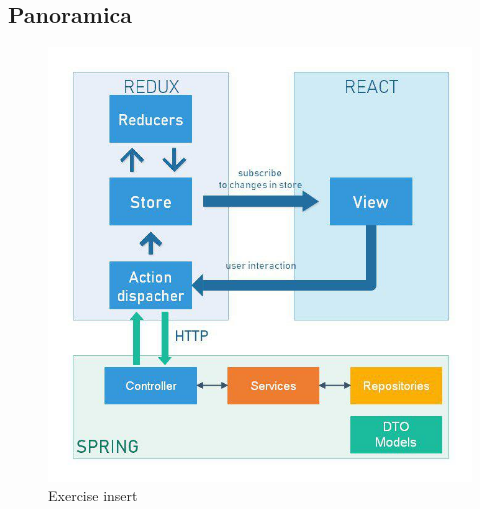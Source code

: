\subsection{Panoramica}
\begin{figure}[H]
\centering
\includegraphics[width=17cm, keepaspectratio]{img/photo_2019-04-08_19-26-02.jpg} 
\caption{Exercise insert}
\end{figure}

